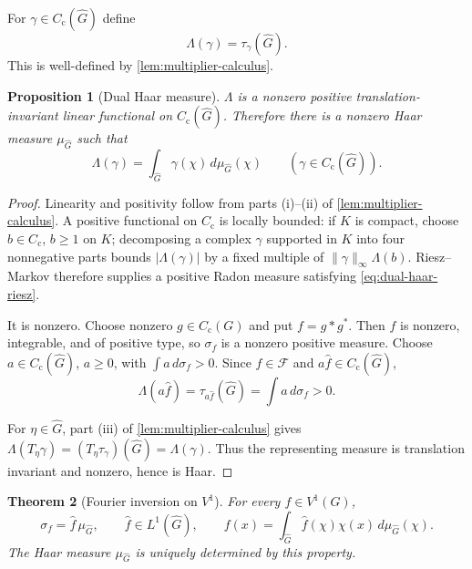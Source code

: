 \documentclass[11pt]{article}
\newtheorem{theorem}{Theorem}[section]
\newtheorem{proposition}[theorem]{Proposition}
\theoremstyle{definition}
\theoremstyle{remark}
\newcommand{\Cc}{C_{\mathrm c}}
\newcommand{\Lp}[1]{L^{#1}}
\newcommand{\dual}[1]{\widehat{#1}}
\newcommand{\abs}[1]{\lvert #1\rvert}
\newcommand{\norm}[1]{\lVert #1\rVert}
\begin{document}
For $\gamma\in\Cc(\dual G)$ define
\begin{equation}
  \Lambda(\gamma)=\tau_\gamma(\dual G).
  \label{eq:Lambda-dual-measure}
\end{equation}
This is well-defined by \cref{lem:multiplier-calculus}.

\begin{proposition}[Dual Haar measure]
\label{prop:dual-haar-measure}
$\Lambda$ is a nonzero positive translation-invariant linear functional on
$\Cc(\dual G)$.  Therefore there is a nonzero Haar measure $\mu_{\dual G}$ such that
\begin{equation}
  \Lambda(\gamma)=\int_{\dual G}\gamma(\chi)\,d\mu_{\dual G}(\chi)
  \qquad(\gamma\in\Cc(\dual G)).
  \label{eq:dual-haar-riesz}
\end{equation}
\end{proposition}

\begin{proof}
Linearity and positivity follow from parts (i)--(ii) of
\cref{lem:multiplier-calculus}.  A positive functional on $\Cc$ is locally bounded:
if $K$ is compact, choose $b\in\Cc$, $b\geq1$ on $K$; decomposing a complex
$\gamma$ supported in $K$ into four nonnegative parts bounds
$\abs{\Lambda(\gamma)}$ by a fixed multiple of
$\norm\gamma_\infty\Lambda(b)$.  Riesz--Markov therefore supplies a positive Radon
measure satisfying \eqref{eq:dual-haar-riesz}.

It is nonzero.  Choose nonzero $g\in\Cc(G)$ and put $f=g*g^*$.  Then $f$ is nonzero,
integrable, and of positive type, so $\sigma_f$ is a nonzero positive measure.  Choose
$a\in\Cc(\dual G)$, $a\geq0$, with $\int a\,d\sigma_f>0$.  Since
$\widehat f\in\mathcal F$ and $a\widehat f\in\Cc(\dual G)$,
\[
 \Lambda(a\widehat f)=\tau_{a\widehat f}(\dual G)
 =\int a\,d\sigma_f>0.
\]

For $\eta\in\dual G$, part (iii) of \cref{lem:multiplier-calculus} gives
$\Lambda(T_\eta\gamma)=(T_\eta\tau_\gamma)(\dual G)=\Lambda(\gamma)$.  Thus the
representing measure is translation invariant and nonzero, hence is Haar.
\end{proof}

\begin{theorem}[Fourier inversion on $V^1$]
\label{thm:fourier-inversion-V}
For every $f\in V^1(G)$,
\begin{equation}
  \sigma_f=\widehat f\,\mu_{\dual G},
  \qquad \widehat f\in\Lp1(\dual G),
  \qquad
  f(x)=\int_{\dual G}\widehat f(\chi)\chi(x)\,d\mu_{\dual G}(\chi).
  \label{eq:inversion-V}
\end{equation}
The Haar measure $\mu_{\dual G}$ is uniquely determined by this property.
\end{theorem}
\end{document}
